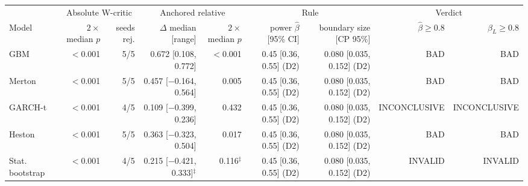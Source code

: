 \begin{tabular}{lrrrrrrrr}
\toprule
 & \multicolumn{2}{c}{Absolute W-critic} & \multicolumn{2}{c}{Anchored relative} & \multicolumn{2}{c}{Rule} & \multicolumn{2}{c}{Verdict} \\
\cmidrule(lr){2-3} \cmidrule(lr){4-5} \cmidrule(lr){6-7} \cmidrule(lr){8-9}
Model & $2\times$median $p$ & seeds rej. & $\Delta$ median [range] & $2\times$median $p$ & power $\hat\beta$ [95\% CI] & boundary size [CP 95\%] & $\hat\beta\ge0.8$ & $\beta_L\ge0.8$ \\
\midrule
GBM & $<$0.001 & 5/5 & 0.672 [0.108, 0.772] & $<$0.001 & 0.45 [0.36, 0.55] (D2) & 0.080 [0.035, 0.152] (D2) & BAD & BAD \\
Merton & $<$0.001 & 5/5 & 0.457 [$-$0.164, 0.564] & 0.005 & 0.45 [0.36, 0.55] (D2) & 0.080 [0.035, 0.152] (D2) & BAD & BAD \\
GARCH-t & $<$0.001 & 4/5 & 0.109 [$-$0.399, 0.236] & 0.432 & 0.45 [0.36, 0.55] (D2) & 0.080 [0.035, 0.152] (D2) & INCONCLUSIVE & INCONCLUSIVE \\
Heston & $<$0.001 & 5/5 & 0.363 [$-$0.323, 0.504] & 0.017 & 0.45 [0.36, 0.55] (D2) & 0.080 [0.035, 0.152] (D2) & BAD & BAD \\
Stat. bootstrap & $<$0.001 & 4/5 & 0.215 [$-$0.421, 0.333]$^{\ddagger}$ & 0.116$^{\ddagger}$ & 0.45 [0.36, 0.55] (D2) & 0.080 [0.035, 0.152] (D2) & INVALID & INVALID \\
\bottomrule
\end{tabular}
